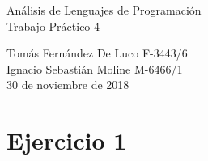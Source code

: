 \documentclass{article}
\begin{document}
\begin{titlepage}
\vspace{5.5cm}

\begin{center}
\LARGE{\sc Análisis de Lenguajes de Programación}\\
\vspace{0.5cm}
\large{Trabajo Práctico 4}\\

\vspace{5cm}

\large
Tomás Fernández De Luco F-3443/6\\
Ignacio Sebastián Moline M-6466/1\\

\vspace*{0.5cm}
\small{30 de noviembre de 2018}

\makeatletter
\def\@seccntformat#1{%
  \expandafter\ifx\csname c@#1\endcsname\c@section\else
  \csname the#1\endcsname\quad
  \fi}
\makeatother



\end{center}
\end{titlepage}
\lstset{basicstyle=\small,style=myCustom}
\newpage
\section*{Ejercicio 1}
\end{document}
